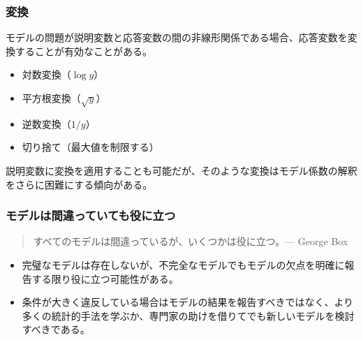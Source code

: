 
\begin{frame}
\frametitle{変換}

モデルの問題が説明変数と応答変数の間の非線形関係である場合、応答変数を変換することが有効なことがある。

\begin{itemize}

\item 対数変換（$\log y$）
\item 平方根変換（$\sqrt{y}$）
\item 逆数変換（$1/y$）
\item 切り捨て（最大値を制限する）

\end{itemize}

説明変数に変換を適用することも可能だが、そのような変換はモデル係数の解釈をさらに困難にする傾向がある。

\end{frame}


\begin{frame}
\frametitle{モデルは間違っていても役に立つ}

\begin{quote}
すべてのモデルは間違っているが、いくつかは役に立つ。--- George Box
\end{quote}

\begin{itemize}

\item 完璧なモデルは存在しないが、不完全なモデルでもモデルの欠点を明確に報告する限り役に立つ可能性がある。

\item 条件が大きく違反している場合はモデルの結果を報告すべきではなく、より多くの統計的手法を学ぶか、専門家の助けを借りてでも新しいモデルを検討すべきである。

\end{itemize}

\end{frame}

